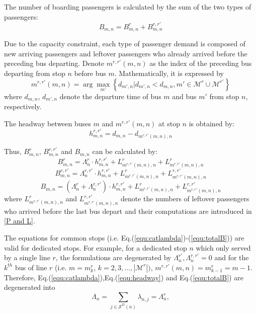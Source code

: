 \documentclass[smallextended]{svjour3}       %
\begin{document}
\begin{Abstract}
The number of boarding passengers is calculated by the sum of the two types of passengers:
\begin{equation}
    B_{m,n}=B_{m,n}^{r}+B_{m,n}^{r,r'}
\end{equation}

Due to the capacity constraint, 
each type of passenger demand is composed of new arriving passengers 
and leftover passengers who already arrived before the preceding bus departing.
Denote $m^{r,r'}\left(m,n\right)$ as the index of the preceding bus departing from stop $n$ before bus $m$.
Mathematically, it is expressed by
\begin{equation}
    m^{r,r'}\left(m,n\right)=\arg \max_{m'} \left\{d_{m',n} | d_{m',n} < d_{m,n},m'\in\mathcal{M}^{r} \cup \mathcal{M}^{r'}\right\}
\end{equation}
where $d_{m,n}$, $d_{m',n}$ denote the departure time of bus $m$ and bus $m'$ from stop $n$, respectively. 

The headway between buses $m$ and $m^{r,r'}\left(m,n\right)$ at stop $n$ is obtained by:
\begin{equation}
    \label{equ:headway}
    h_{m,n}^{r,r'}=d_{m,n}-d_{m^{r,r'}\left(m,n\right),n}
\end{equation}

Thus, $B_{m,n}^{r}$, $B_{m,n}^{r,r'}$ and $B_{m,n}$ can be calculated by:
\begin{equation}\label{equ:B^r}
    B_{m,n}^{r} = \Lambda_{n}^{r} \cdot h_{m,n}^{r,r'} + L_{m^{r,r'}\left(m,n\right),n}^{r} + L_{m^{r,r'}\left(m,n\right),n}^{r}
\end{equation}
\begin{equation}\label{equ:B^rr'}
    B_{m,n}^{r,r'} = \Lambda_{n}^{r,r'} \cdot h_{m,n}^{r,r'} + L_{m^{r,r'}\left(m,n\right),n}^{r} + L_{m^{r,r'}\left(m,n\right),n}^{r,r'}
\end{equation}
\begin{equation}
    \label{equ:totalB}
    B_{m,n} = \left(\Lambda_{n}^{r} + \Lambda_{n}^{r,r'}\right) \cdot h_{m,n}^{r,r'} + L_{m^{r,r'}\left(m,n\right),n}^{r} + L_{m^{r,r'}\left(m,n\right),n}^{r,r'}
\end{equation}
where $L_{m^{r,r'}\left(m,n\right),n}^{r}$ and $L_{m^{r,r'}\left(m,n\right),n}^{r,r'}$ 
denote the numbers of leftover passengers who arrived before the last bus depart and their computations are introduced in \ref{P and L}.

The equations for common stops (i.e. Eq.(\ref{equ:catlambda})-(\ref{equ:totalB})) are valid for dedicated stops.
For example, for a dedicated stop $n$ which only served by a single line $r$,
the formulations are degenerated by $\Lambda_{n}^{r'},\Lambda_{n}^{r,r'}=0$ 
and for the  $k^{th}$ bus of line $r$ (i.e. $m=m^{r}_{k}$, $k=2,3,...,\left|\mathcal{M}^{r}\right|)$, $m^{r,r'}\left(m,n\right)=m^{r}_{k-1}=m-1$.
Therefore, Eq.(\ref{equ:catlambda}),Eq.(\ref{equ:headway}) and Eq.(\ref{equ:totalB}) are degenerated into 
\begin{equation}
    \Lambda_{n} = \sum_{j \in \mathcal{S}^{D}\left(n\right)} \lambda_{n,j} = \Lambda_{n}^{r},
\end{equation}


\end{Abstract}
\end{document}
